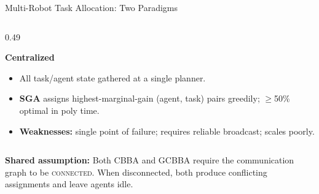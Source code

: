 \documentclass[aspectratio=169, 11pt]{beamer}
\newcommand{\subheader}[1]{{\rmfamily\bfseries\normalsize\color{TextPrimary} #1}}
\newcommand{\mutedtext}[1]{{\rmfamily\small\color{TextMuted} #1}}
\newenvironment{tightitemize}{\begin{itemize}}{\end{itemize}}
\begin{document}
\begin{frame}{Multi-Robot Task Allocation: Two Paradigms}
  \begin{columns}[T]
    \begin{column}{0.49\textwidth}
      \begin{heroboxnavy}[top=4pt, bottom=4pt]
        {\rmfamily\bfseries\normalsize Centralized}\par\vspace{2pt}
        \begin{tightitemize}
          \item All task/agent state gathered at a single planner.
          \item \textbf{SGA} assigns highest-marginal-gain (agent, task) pairs greedily; $\geq$50\% optimal in poly time.
          \item \textbf{Weaknesses:} single point of failure; requires reliable broadcast; scales poorly.
        \end{tightitemize}
      \end{heroboxnavy}
    \end{column}

  \end{columns}

  \vspace{4pt}
  
  \begin{dangerbox}[top=4pt, bottom=4pt]
    \textbf{Shared assumption:} Both CBBA and GCBBA require the communication graph to be \textsc{connected}. When disconnected, both produce conflicting assignments and leave agents idle.
  \end{dangerbox}
\end{frame}
\end{document}
